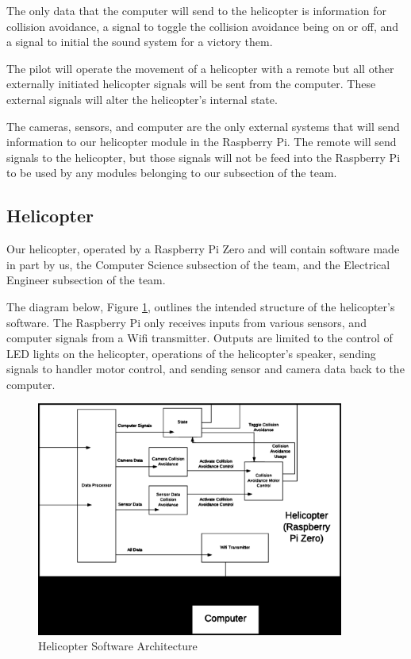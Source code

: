 \documentclass[onecolumn, oneside, letterpaper, draftclsnofoot, 10pt, compsoc]{IEEEtran}
\begin{document}
The only data that the computer will send to the helicopter is information for collision avoidance, a signal to toggle the collision avoidance being on or off, and a signal to initial the sound system for a victory them.

The pilot will operate the movement of a helicopter with a remote but all other externally initiated helicopter signals will be sent from the computer. These external signals will alter the helicopter's internal state.

The cameras, sensors, and computer are the only external systems that will send information to our helicopter module in the Raspberry Pi. The remote will send signals to the helicopter, but those signals will not be feed into the Raspberry Pi to be used by any modules belonging to our subsection of the team.

\subsection{Helicopter}
Our helicopter, operated by a Raspberry Pi Zero and will contain software made in part by us, the Computer Science subsection of the team, and the Electrical Engineer subsection of the team.

The diagram below, Figure \ref{fig:HelicopterSoftwareArchitecture}, outlines the intended structure of the helicopter's software. The Raspberry Pi only receives inputs from various sensors, and computer signals from a Wifi transmitter. Outputs are limited to the control of LED lights on the helicopter, operations of the helicopter's speaker, sending signals to handler motor control, and sending sensor and camera data back to the computer.

\begin{figure}[h]
    \centering
    \includegraphics[width=0.9\textwidth]{graphics/helicopter_diagram.eps}
    \caption{Helicopter Software Architecture}
    \label{fig:HelicopterSoftwareArchitecture}
\end{figure}
\end{document}
